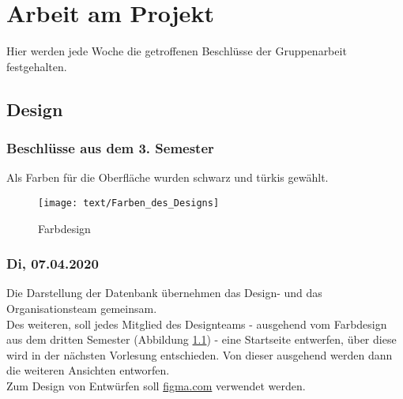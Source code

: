 \chapter{Arbeit am Projekt}
Hier werden jede Woche die getroffenen Beschlüsse der Gruppenarbeit festgehalten.
\section{Design}
\subsection{Beschlüsse aus dem 3. Semester}
Als Farben für die Oberfläche wurden schwarz und türkis gewählt.
	\begin{figure}[h!]
		\centering
		\texttt{[image: text/Farben\_des\_Designs]}
		\caption{Farbdesign}
		\label{farbdesign}
	\end{figure}
\subsection{Di, 07.04.2020}
Die Darstellung der Datenbank übernehmen das Design- und das Organisationsteam gemeinsam.\\
Des weiteren, soll jedes Mitglied des Designteams - ausgehend vom Farbdesign aus dem dritten Semester (Abbildung \ref{farbdesign}) - eine Startseite entwerfen, über diese wird in der nächsten Vorlesung entschieden.
Von dieser ausgehend werden dann die weiteren Ansichten entworfen.\\
Zum Design von Entwürfen soll \href{https://www.figma.com/}{figma.com} verwendet werden.
